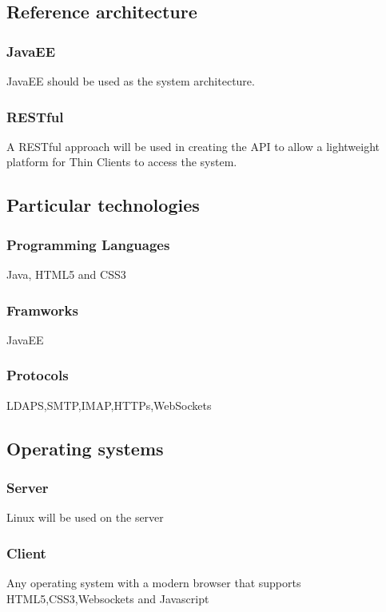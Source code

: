 
\subsection{Reference architecture}
	\subsubsection{JavaEE}
		JavaEE should be used as the system architecture.
	\subsubsection{RESTful}
		A RESTful approach will be used in creating the API to allow a lightweight platform for Thin Clients to access the system.
\subsection{Particular technologies}
	\subsubsection{Programming Languages}
		Java, HTML5 and CSS3
	\subsubsection{Framworks}
		JavaEE
	\subsubsection{Protocols}
		LDAPS,SMTP,IMAP,HTTPs,WebSockets	
\subsection{Operating systems}
	\subsubsection{Server}
		Linux will be used on the server
	\subsubsection{Client}
		Any operating system with a modern browser that supports HTML5,CSS3,Websockets and Javascript
	